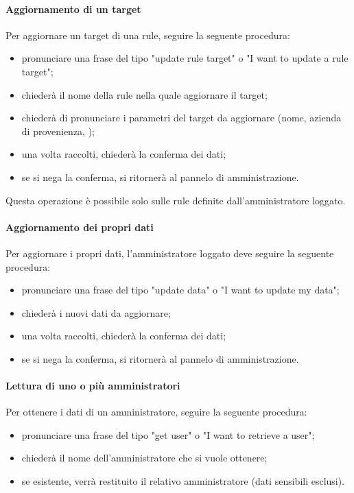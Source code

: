 \paragraph{Aggiornamento di un target}\label{updateRuleTarget}
Per aggiornare un target di una rule, seguire la seguente procedura:
\begin{itemize}
	\item pronunciare una frase del tipo "update rule target" o "I want to update a rule target";
	\item \PROGETTO{} chiederà il nome della rule nella quale aggiornare il target;
	\item \PROGETTO{} chiederà di pronunciare i parametri del target da aggiornare (nome, azienda di provenienza, );
	\item una volta raccolti, \PROGETTO{} chiederà la conferma dei dati;
	\item se si nega la conferma, si ritornerà al pannelo di amministrazione.
\end{itemize}
Questa operazione è possibile solo sulle rule definite dall'amministratore loggato.
\paragraph{Aggiornamento dei propri dati}

Per aggiornare i propri dati, l'amministratore loggato deve seguire la seguente procedura:
\begin{itemize}
	\item pronunciare una frase del tipo "update data" o "I want to update my data";
	\item \PROGETTO{} chiederà i nuovi dati da aggiornare;
	\item una volta raccolti, \PROGETTO{} chiederà la conferma dei dati;
	\item se si nega la conferma, si ritornerà al pannelo di amministrazione.
\end{itemize}

\paragraph{Lettura di uno o più amministratori}
Per ottenere i dati di un amministratore, seguire la seguente procedura:
\begin{itemize}
	\item pronunciare una frase del tipo "get user" o "I want to retrieve a user";
	\item \PROGETTO{} chiederà il nome dell'amministratore che si vuole ottenere;
	\item se esistente, verrà restituito il relativo amministratore (dati sensibili esclusi).
\end{itemize}

